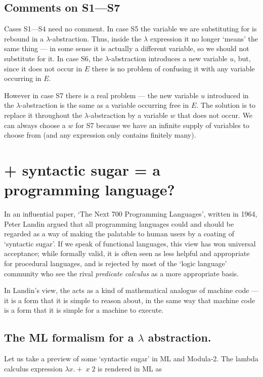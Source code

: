 \subsection{Comments on S1---S7}

Cases S1---S4  need no comment. In case S5 the variable we are substituting
for is rebound in a $\lambda$-abstraction. Thus, inside the $\lambda$
expression it no longer `means' the same thing --- in some sense it is
actually a different variable, so we should not substitute for it.  In case
S6, the $\lambda$-abstraction introduces a new variable $u$, but, since it
does not occur in $E$ there is no problem of confusing it with any variable
occurring in $E$.

However in case S7 there is a real problem --- the new variable $u$
introduced in the $\lambda$-abstraction is the same as a variable occurring
free in $E$. The solution is to replace it throughout the
$\lambda$-abstraction by a variable $w$ that does not occur.
We can always choose a $w$ for S7 because we have an infinite supply of
variables to choose from (and any \LC expression only contains finitely
many).


\section {\LC + syntactic sugar = a programming language?}
In an influential paper, `The  Next 700 Programming Languages', written  in
1964, Peter Landin argued that  all programming languages could and  should
be regarded  as a  way of  making the  \LC palatable  to human  users  by a
coating of `syntactic  sugar'. If  we speak of  functional languages,  this
view has won universal  acceptance; while formally  valid, it is  often
seen as  less helpful  and  appropriate for  procedural languages,  and  is
rejected by most of the `logic  language' community who see the rival  {\em
predicate calculus} as a more appropriate basis.

In Landin's view, the \LC acts as a kind of mathematical analogue of
machine code --- it is a form that it is simple to reason about, in the
same way that machine code is a form that it is simple for a machine to
execute.

\subsection{The ML formalism for a $\lambda$ abstraction.}
Let us take a preview of some `syntactic sugar' in ML and Modula-2. The
lambda calculus expression $\lambda x. +\; x\; 2$ is rendered in ML as

